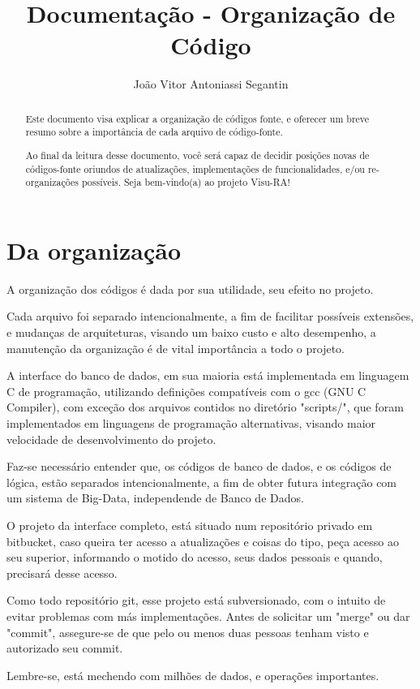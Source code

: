 \documentclass[onecolumn,12pt]{article}
\title{Documentação - Organização de Código}
\author{João Vitor Antoniassi Segantin}
\begin{document}
	\maketitle
	\begin{abstract}
		Este documento visa explicar a organização de códigos fonte, e oferecer um breve resumo sobre a importância de cada arquivo de código-fonte.\par
		Ao final da leitura desse documento, você será capaz de decidir posições novas de códigos-fonte oriundos de atualizações, implementações de funcionalidades, e/ou re-organizações possíveis.
		Seja bem-vindo(a) ao projeto Visu-RA!
	\end{abstract}
	\newpage
	\indent
	
    \section{Da organização}
    	A organização dos códigos é dada por sua utilidade, seu efeito no projeto.\par
    	Cada arquivo foi separado intencionalmente, a fim de facilitar possíveis extensões, e mudanças de arquiteturas, visando um baixo custo e alto desempenho, a manutenção da organização é de vital importância a todo o projeto. \par
		A interface do banco de dados, em sua maioria está implementada em linguagem C de programação, utilizando definições compatíveis com o gcc (GNU C Compiler), com exceção dos arquivos contidos no diretório "scripts/", que foram implementados em linguagens de programação alternativas, visando maior velocidade de desenvolvimento do projeto.\par
    	Faz-se necessário entender que, os códigos de banco de dados, e os códigos de lógica, estão separados intencionalmente, a fim de obter futura integração com um sistema de Big-Data, independende de Banco de Dados.\par
    	O projeto da interface completo, está situado num repositório privado em bitbucket, caso queira ter acesso a atualizações e coisas do tipo, peça acesso ao seu superior, informando o motido do acesso, seus dados pessoais e quando, precisará desse acesso.\par
    	Como todo repositório git, esse projeto está subversionado, com o intuito de evitar problemas com más implementações. Antes de solicitar um "merge" ou dar "commit", assegure-se de que pelo ou menos duas pessoas tenham visto e autorizado seu commit.\par
    	Lembre-se, está mechendo com milhões de dados, e operações importantes.
    
\end{document}

